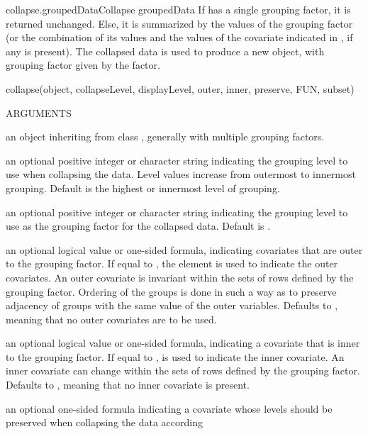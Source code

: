 \documentclass[pdftex]{article} \usepackage{url,graphicx}
\begin{document}
\begin{Helpfile}{collapse.groupedData}{Collapse groupedData}
If  has a single grouping factor, it is returned
unchanged. Else, it is summarized by the values of the
 grouping factor (or the combination of its values
and the values of the covariate indicated in , if any is
present). The collapsed data is used to produce a new
 object, with grouping factor given by the
 factor.
\begin{Example}
collapse(object, collapseLevel, displayLevel, outer, inner,
         preserve, FUN, subset)
\end{Example}
\begin{Argument}{ARGUMENTS}
\item[\Co{object:}]
an object inheriting from class ,
generally with multiple grouping factors.
\item[\Co{collapseLevel:}]
an optional positive integer or character string
indicating the grouping level to use when collapsing the data. Level
values increase from outermost to innermost grouping. Default is the
highest or innermost level of grouping.
\item[\Co{displayLevel:}]
an optional positive integer or character string
indicating the grouping level to use as the grouping factor for the
collapsed data. Default is .
\item[\Co{outer:}]
an optional logical value or one-sided formula,
indicating covariates that are outer to the 
grouping factor. If equal to , the 
element  is used to indicate the 
outer covariates. An outer covariate is invariant within the sets
of rows defined by the grouping factor.  Ordering of the groups is
done in such a way as to preserve adjacency of groups with the same
value of the outer variables. Defaults to , meaning that
no outer covariates are to be used.
\item[\Co{inner:}]
an optional logical value or one-sided formula, indicating
a covariate that is inner to the  grouping
factor. If equal to ,  is used
to indicate the inner covariate. An inner covariate can change within
the sets of rows defined by the grouping  factor. Defaults to
, meaning that no inner covariate is present.  
\item[\Co{preserve:}]
an optional one-sided formula indicating a covariate
whose levels should be preserved when collapsing the data according

\end{Argument}
\end{Helpfile}
\end{document}
